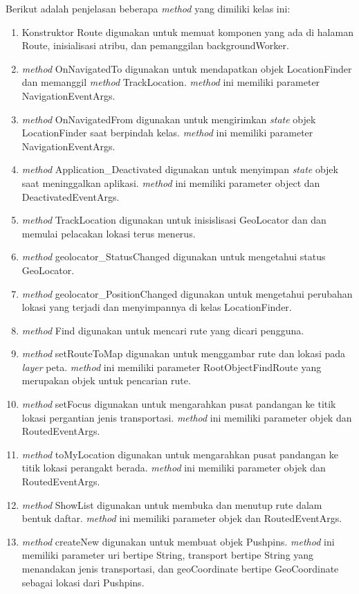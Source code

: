 Berikut adalah penjelasan beberapa \textit{method} yang dimiliki kelas ini:
\begin{enumerate}
	\item Konstruktor Route digunakan untuk memuat komponen yang ada di halaman Route, inisialisasi atribu, dan pemanggilan backgroundWorker.
	\item \textit{method} OnNavigatedTo digunakan untuk mendapatkan objek LocationFinder dan memanggil \textit{method} TrackLocation. \textit{method} ini memiliki parameter NavigationEventArgs.
	\item \textit{method} OnNavigatedFrom digunakan untuk mengirimkan \textit{state} objek LocationFinder saat berpindah kelas. \textit{method} ini memiliki parameter NavigationEventArgs.
	\item \textit{method} Application\_Deactivated digunakan untuk menyimpan \textit{state} objek saat meninggalkan aplikasi. \textit{method} ini memiliki parameter object dan DeactivatedEventArgs.
	\item \textit{method} TrackLocation digunakan untuk inisislisasi GeoLocator dan dan memulai pelacakan lokasi terus menerus. 
	\item \textit{method} geolocator\_StatusChanged digunakan untuk mengetahui status GeoLocator.
	\item \textit{method} geolocator\_PositionChanged digunakan untuk mengetahui perubahan lokasi yang terjadi dan menyimpannya di kelas LocationFinder.
	\item \textit{method} Find digunakan untuk mencari rute yang dicari pengguna.
	\item \textit{method} setRouteToMap digunakan untuk menggambar rute dan lokasi pada \textit{layer} peta. \textit{method} ini memiliki parameter RootObjectFindRoute yang merupakan objek untuk pencarian rute.
	\item \textit{method} setFocus digunakan untuk mengarahkan pusat pandangan ke titik lokasi pergantian jenis transportasi. \textit{method} ini memiliki parameter objek dan RoutedEventArgs.
	\item \textit{method} toMyLocation digunakan untuk mengarahkan pusat pandangan ke titik lokasi perangakt berada. \textit{method} ini memiliki parameter objek dan RoutedEventArgs.
	\item \textit{method} ShowList digunakan untuk membuka dan menutup rute dalam bentuk daftar. \textit{method} ini memiliki parameter objek dan RoutedEventArgs.
	\item \textit{method} createNew digunakan untuk membuat objek Pushpins. \textit{method} ini memiliki parameter uri bertipe String, transport bertipe String yang menandakan jenis transportasi, dan geoCoordinate bertipe GeoCoordinate sebagai lokasi dari Pushpins.

\end{enumerate}

